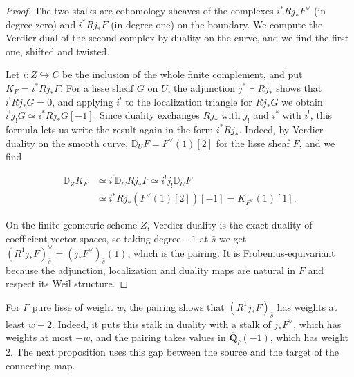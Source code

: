 \documentclass[11pt]{article}
\begin{document}
\begin{proof}[{Proof}]\label{bp246}%
The two stalks are cohomology sheaves of the complexes \(i^*Rj_*F^\vee\) (in degree zero) and \(i^*Rj_*F\) (in degree one) on the boundary. We compute the Verdier dual of the second complex by duality on the curve, and we find the first one, shifted and twisted.

Let \(i:Z\hookrightarrow C\) be the inclusion of the whole finite complement, and put \(K_F=i^*Rj_*F\). For a lisse sheaf \(G\) on \(U\), the adjunction \(j^*\dashv Rj_*\) shows that \(i^!Rj_*G=0\), and applying \(i^!\) to the localization triangle for \(Rj_*G\) we obtain \(i^!j_!G\simeq i^*Rj_*G[-1]\). Since duality exchanges \(Rj_*\) with \(j_!\) and \(i^*\) with \(i^!\), this formula lets us write the result again in the form \(i^*Rj_*\). Indeed, by Verdier duality on the smooth curve, \(\mathbb D_UF=F^\vee(1)[2]\) for the lisse sheaf \(F\), and we find

\[
\begin{split}
\mathbb D_Z K_F
&\simeq i^!\mathbb D_C Rj_*F
\simeq i^!j_!\mathbb D_UF\\
&\simeq i^*Rj_*(F^\vee(1)[2])[-1]
=K_{F^\vee}(1)[1].
\end{split}
\]

On the finite geometric scheme \(Z\), Verdier duality is the exact duality of coefficient vector spaces, so taking degree \(-1\) at \(\bar s\) we get \((R^1j_*F)_{\bar s}^\vee=(j_*F^\vee)_{\bar s}(1)\), which is the pairing. It is Frobenius-equivariant because the adjunction, localization and duality maps are natural in \(F\) and respect its Weil structure.
\end{proof}

\label{bp247}%
For \(F\) pure lisse of weight \(w\), the pairing shows that \((R^1j_*F)_{\bar s}\) has weights at least \(w+2\). Indeed, it puts this stalk in duality with a stalk of \(j_*F^\vee\), which has weights at most \(-w\), and the pairing takes values in \(\overline{\mathbf Q}_\ell(-1)\), which has weight \(2\). The next proposition uses this gap between the source and the target of the connecting map.
\end{document}
